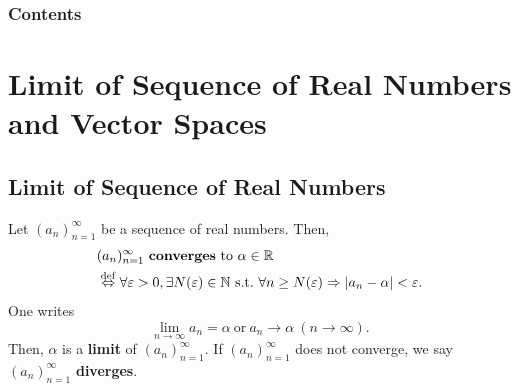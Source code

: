 \begin{frame}
	\titlepage
\end{frame}

\begin{frame}[fragile]
  \frametitle{Contents}
	\tableofcontents
\end{frame}
\setcounter{section}{0}
\section{Limit of Sequence of Real Numbers and Vector Spaces}
\subsection{Limit of Sequence of Real Numbers}
\begin{frame}[fragile]
  \begin{defi}
    Let $(a_n)_{n=1}^\infty$ be a sequence of real numbers.
    Then,\\
    \begin{align*}
      & (a_n)_{n=1}^\infty\ \mbox{{\bf converges} to}\ \alpha\in\mathbb R\\
      & \overset{\mathrm{def}}{\Leftrightarrow}\forall \varepsilon > 0, \exists N(\varepsilon)\in {\mathbb N}\ \mbox{s.t.}\ \forall n\geq N(\varepsilon)\Rightarrow\left|a_n-\alpha\right|<\varepsilon.
    \end{align*}
    One writes
    \[
      \lim_{n\to\infty}a_n=\alpha\ \mbox{or}\ a_n\to\alpha\ (n\to\infty).
    \]
  	Then, $\alpha$ is a {\bf limit} of $(a_n)_{n=1}^\infty$.
  	If $(a_n)_{n=1}^\infty$ does not converge, we say $(a_n)_{n=1}^\infty$ {\bf diverges}.
  \end{defi}
\end{frame}
\begin{comment}
\begin{frame}[fragile]
	\begin{axio}[Weierstrass(1815-1897)]
    For all upper bounded subset $A\subset R$, {\bf supremum} $\sup A\in R$ exists.
    Similarly, for all lower bounded sbuset $A\subset R$, {\bf infimum} $\inf A\in R$ exists.
  \end{axio}
\end{frame}

\begin{frame}[fragile]
  \begin{exer}[convergent sequences are bounded]
    A sequence of real numbers $(a_n)_{n=1}^\infty$ converges the real number $\alpha\in\mathbb R$.
    Prove that $(a_n)_{n=1}^\infty$ is (upper and lower) bounded.
  \end{exer}
\end{frame}
\end{comment}

